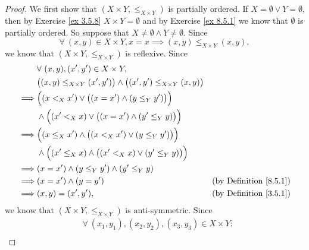 \begin{proof}
    We first show that \((X \times Y, \leq_{X \times Y})\) is partially ordered.
    If \(X = \emptyset \lor Y = \emptyset\), then by Exercise \ref{ex 3.5.8} \(X \times Y = \emptyset\) and by Exercise \ref{ex 8.5.1} we know that \(\emptyset\) is partially ordered.
    So suppose that \(X \neq \emptyset \land Y \neq \emptyset\).
    Since
    \[
        \forall\ (x, y) \in X \times Y, x = x \implies (x, y) \leq_{X \times Y} (x, y),
    \]
    we know that \((X \times Y, \leq_{X \times Y})\) is reflexive.
    Since
    \begin{align*}
                 & \forall\ (x, y), (x', y') \in X \times Y,                                                                                          \\
                 & \big((x, y) \leq_{X \times Y} (x', y')\big) \land \big((x', y') \leq_{X \times Y} (x, y)\big)                                      \\
        \implies & \Big((x <_X x') \lor \big((x = x') \land (y \leq_Y y')\big)\Big)                                                                   \\
                 & \land \Big((x' <_X x) \lor \big((x = x') \land (y' \leq_Y y)\big)\Big)                                                             \\
        \implies & \Big((x \leq_X x') \land \big((x <_X x') \lor (y \leq_Y y')\big)\Big)                                                              \\
                 & \land \Big((x' \leq_X x) \land \big((x' <_X x) \lor (y' \leq_Y y)\big)\Big)                                                        \\
        \implies & (x = x') \land (y \leq_Y y') \land (y' \leq_Y y)                                                                                   \\
        \implies & (x = x') \land (y = y')                                                                       & \text{(by Definition \ref{8.5.1})} \\
        \implies & (x, y) = (x', y'),                                                                            & \text{(by Definition \ref{3.5.1})}
    \end{align*}
    we know that \((X \times Y, \leq_{X \times Y})\) is anti-symmetric.
    Since
    \begin{align*}
                 & \forall\ (x_1, y_1), (x_2, y_2), (x_3, y_3) \in X \times Y :                                                                                   \\

\end{align*}
\end{proof}
